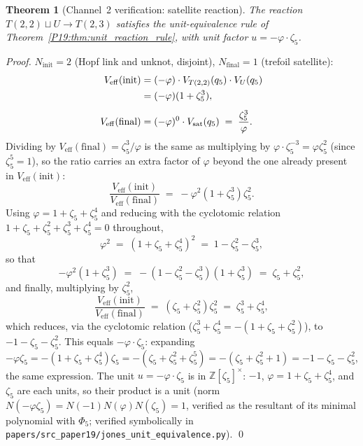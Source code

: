\documentclass[11pt,a4paper]{article}
\newtheorem{theorem}{Theorem}[section]
\theoremstyle{definition}\newtheorem{definition}[theorem]{Definition}
\theoremstyle{remark}
\newcommand{\vp}{\varphi}
\newcommand{\Jones}{V}
\begin{document}
\begin{theorem}[Channel~2 verification: satellite reaction]
\label{P19:thm:channel_2}
The reaction
$T(2,2)\sqcup U\to T(2,3)$
satisfies the unit-equivalence rule of
Theorem~\ref{P19:thm:unit_reaction_rule}, with unit factor
$u=-\vp\cdot\zeta_5$.
\end{theorem}

\begin{proof}
$N_{\mathrm{init}}=2$ (Hopf link and unknot, disjoint),
$N_{\mathrm{final}}=1$ (trefoil satellite):
\begin{align}
  \Jones_{\mathrm{eff}}(\mathrm{init})
  &= (-\vp)\cdot\Jones_{T(2,2)}(q_5)\cdot\Jones_U(q_5) \notag\\
  &= (-\vp)(1+\zeta_5^3),
  \label{P19:eq:V_init_ch2}\\[4pt]
  \Jones_{\mathrm{eff}}(\mathrm{final})
  &= (-\vp)^0\cdot\Jones_{\rm sat}(q_5)
  \;=\; \frac{\zeta_5^3}{\vp}.
  \label{P19:eq:V_final_ch2}
\end{align}
Dividing by $\Jones_{\mathrm{eff}}(\mathrm{final})=\zeta_5^3/\vp$ is the
same as multiplying by $\vp\cdot\zeta_5^{-3}=\vp\zeta_5^2$ (since
$\zeta_5^5=1$), so the ratio carries an extra factor of $\vp$ beyond
the one already present in $\Jones_{\mathrm{eff}}(\mathrm{init})$:
\begin{equation}
  \frac{\Jones_{\mathrm{eff}}(\mathrm{init})}
       {\Jones_{\mathrm{eff}}(\mathrm{final})}
  \;=\; -\vp^2(1+\zeta_5^3)\zeta_5^2.
  \label{P19:eq:ch2_setup}
\end{equation}
Using $\vp=1+\zeta_5+\zeta_5^4$ and reducing with the cyclotomic
relation $1+\zeta_5+\zeta_5^2+\zeta_5^3+\zeta_5^4=0$ throughout,
\begin{equation}
  \vp^2 \;=\; (1+\zeta_5+\zeta_5^4)^2 \;=\; 1-\zeta_5^2-\zeta_5^3,
  \label{P19:eq:phi_squared}
\end{equation}
so that
\begin{equation}
  -\vp^2(1+\zeta_5^3) \;=\; -(1-\zeta_5^2-\zeta_5^3)(1+\zeta_5^3)
  \;=\; \zeta_5+\zeta_5^2,
  \label{P19:eq:ch2_numerator}
\end{equation}
and finally, multiplying by $\zeta_5^2$,
\begin{equation}
  \frac{\Jones_{\mathrm{eff}}(\mathrm{init})}
       {\Jones_{\mathrm{eff}}(\mathrm{final})}
  \;=\; (\zeta_5+\zeta_5^2)\zeta_5^2
  \;=\; \zeta_5^3+\zeta_5^4,
  \label{P19:eq:ch2_unit}
\end{equation}
which reduces, via the cyclotomic relation
($\zeta_5^3+\zeta_5^4=-(1+\zeta_5+\zeta_5^2)$), to $-1-\zeta_5-\zeta_5^2$.
This equals $-\vp\cdot\zeta_5$: expanding
$-\vp\zeta_5=-(1+\zeta_5+\zeta_5^4)\zeta_5
=-(\zeta_5+\zeta_5^2+\zeta_5^5)=-(\zeta_5+\zeta_5^2+1)
=-1-\zeta_5-\zeta_5^2$, the same expression.
The unit $u=-\vp\cdot\zeta_5$ is in $\mathbb{Z}[\zeta_5]^\times$:
$-1$, $\vp=1+\zeta_5+\zeta_5^4$, and $\zeta_5$ are each units, so
their product is a unit (norm $N(-\vp\zeta_5)=N(-1)N(\vp)N(\zeta_5)=1$,
verified as the resultant of its minimal polynomial with $\Phi_5$;
verified symbolically in
\texttt{papers/src\_paper19/jones\_unit\_equivalence.py}).
\qed
\end{proof}
\end{document}
